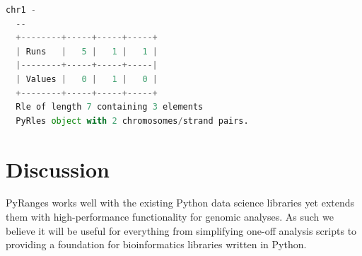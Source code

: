 \documentclass[10pt,letterpaper]{article}
\begin{document}
\begin{adjustwidth}{-2in}{0in}
\begin{flushright}
\begin{lstlisting}[language=Python, linewidth=30cm, basicstyle=\small]
  chr1 -
  --
  +--------+-----+-----+-----+
  | Runs   |   5 |   1 |   1 |
  |--------+-----+-----+-----|
  | Values |   0 |   1 |   0 |
  +--------+-----+-----+-----+
  Rle of length 7 containing 3 elements
  PyRles object with 2 chromosomes/strand pairs.

\end{lstlisting}
\end{flushright}

\end{adjustwidth}

\section*{Discussion}

PyRanges works well with the existing Python data science libraries yet extends
them with high-performance functionality for genomic analyses. As such we
believe it will be useful for everything from simplifying one-off analysis
scripts to providing a foundation for bioinformatics libraries written in
Python.





\end{document}

